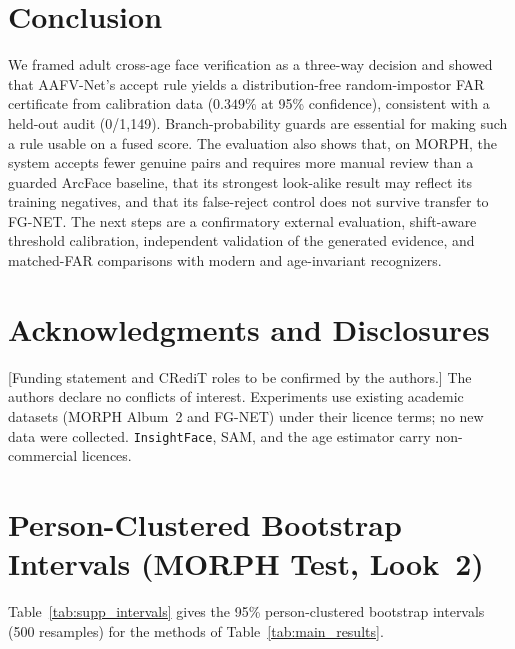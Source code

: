 \documentclass[journal]{IEEEtran}
\newcommand{\sys}{AAFV-Net}
\begin{document}
\section{Conclusion}
\label{sec:conclusion}
We framed adult cross-age face verification as a three-way decision and showed that \sys's accept rule yields a distribution-free random-impostor FAR certificate from calibration data ($0.349\%$ at 95\% confidence), consistent with a held-out audit (0/1,149). Branch-probability guards are essential for making such a rule usable on a fused score. The evaluation also shows that, on MORPH, the system accepts fewer genuine pairs and requires more manual review than a guarded ArcFace baseline, that its strongest look-alike result may reflect its training negatives, and that its false-reject control does not survive transfer to FG-NET. The next steps are a confirmatory external evaluation, shift-aware threshold calibration, independent validation of the generated evidence, and matched-FAR comparisons with modern and age-invariant recognizers.

\section*{Acknowledgments and Disclosures}
[Funding statement and CRediT roles to be confirmed by the authors.] The authors declare no conflicts of interest. Experiments use existing academic datasets (MORPH Album~2 and FG-NET) under their licence terms; no new data were collected. \texttt{InsightFace}, SAM, and the age estimator carry non-commercial licences.

\appendices
\section{Person-Clustered Bootstrap Intervals (MORPH Test, Look~2)}

Table~\ref{tab:supp_intervals} gives the 95\% person-clustered bootstrap intervals (500 resamples) for the methods of Table~\ref{tab:main_results}.



\end{document}
